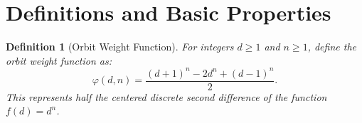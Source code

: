 \documentclass[11pt]{article}
\newtheorem{definition}{Definition}[section]
\begin{document}

\section{Definitions and Basic Properties}\label{sec:definitions}

\begin{definition}[Orbit Weight Function]\label{def:orbit-weight}
For integers $d \geq 1$ and $n \geq 1$, define the orbit weight function as:
\[
\varphi(d,n) = \frac{(d+1)^{n} - 2d^{n} + (d-1)^{n}}{2}.
\]
This represents half the centered discrete second difference of the function $f(d) = d^n$.
\end{definition}
\end{document}
